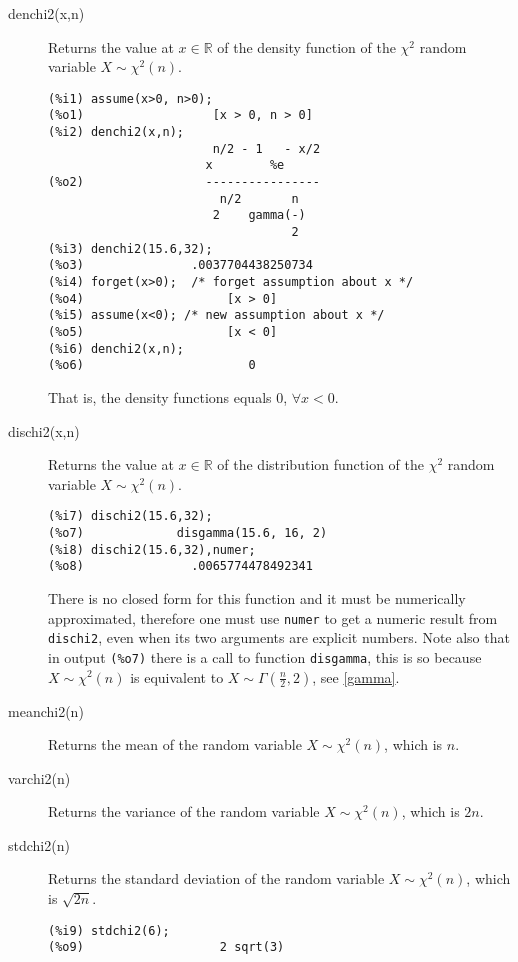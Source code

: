 \documentclass[12pt,a4paper]{article}
\newcommand{\R}{\mathbb{R}}
\begin{document}
\begin{description}

\item[denchi2(x,n)] Returns the value at $x \in \R$ of the density function of the $\chi^2$ random variable $X \sim \chi^2(n)$.

\begin{verbatim}
(%i1) assume(x>0, n>0);
(%o1)                  [x > 0, n > 0]
(%i2) denchi2(x,n);
                       n/2 - 1   - x/2
                      x        %e
(%o2)                 ----------------
                        n/2       n
                       2    gamma(-)
                                  2
(%i3) denchi2(15.6,32);
(%o3)               .0037704438250734
(%i4) forget(x>0);  /* forget assumption about x */
(%o4)                    [x > 0]
(%i5) assume(x<0); /* new assumption about x */
(%o5)                    [x < 0]
(%i6) denchi2(x,n);
(%o6)                       0
\end{verbatim}
That is, the density functions equals 0, $\forall x < 0$.

\item[dischi2(x,n)] Returns the value at $x \in \R$ of the distribution function of the $\chi^2$ random variable $X \sim \chi^2(n)$. 

\begin{verbatim}
(%i7) dischi2(15.6,32);
(%o7)             disgamma(15.6, 16, 2)
(%i8) dischi2(15.6,32),numer;
(%o8)               .0065774478492341
\end{verbatim}
There is no closed form for this function and it must be numerically approximated, therefore one must use \verb|numer| to get a numeric result from \verb|dischi2|, even when its two arguments are explicit numbers. Note also that in output \verb|(%o7)| there is a call to function \verb|disgamma|, this is so because $X \sim \chi^2(n)$ is equivalent to $X \sim \Gamma(\frac{n}{2},2)$, see \ref{gamma}.

\item[meanchi2(n)] Returns the mean of the random variable $X \sim \chi^2(n)$, which is $n$.

\item[varchi2(n)] Returns the variance of the random variable $X \sim \chi^2(n)$, which is $2n$.

\item[stdchi2(n)] Returns the standard deviation of the random variable $X \sim \chi^2(n)$, which is $\sqrt{2n}$.
\begin{verbatim}
(%i9) stdchi2(6);
(%o9)                   2 sqrt(3)
\end{verbatim}


\end{description}
\end{document}

